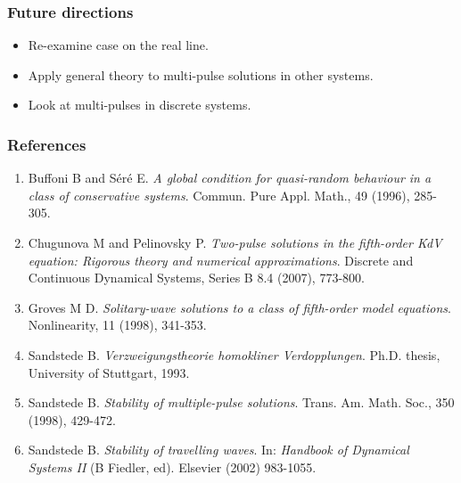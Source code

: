 \documentclass[16pt]{beamer}
\begin{document}
\begin{frame}
	\frametitle{Future directions}
	\fontsize{16}{7.2}\selectfont
	\begin{itemize}
		\item Re-examine case on the real line.
		\vspace{0.5cm}
		\item Apply general theory to multi-pulse solutions in other systems.
		\vspace{0.5cm}
		\item Look at multi-pulses in discrete systems.
	\end{itemize}
\end{frame}

\begin{frame}
	\frametitle{References}
	\fontsize{12}{7.2}\selectfont
	\begin{enumerate}
		\item Buffoni B and S\'er\'e E. \emph{A global condition for quasi-random behaviour in a class of conservative systems}. Commun. Pure Appl. Math., 49 (1996), 285-305.
		\item Chugunova M and Pelinovsky P. \emph{Two-pulse solutions in the fifth-order KdV equation: Rigorous theory and numerical approximations}. Discrete and Continuous Dynamical Systems, Series B 8.4 (2007), 773-800.
		\item Groves M D. \emph{Solitary-wave solutions to a class of fifth-order model equations}. Nonlinearity, 11 (1998), 341-353.
		\item Sandstede B. \emph{Verzweigungstheorie homokliner Verdopplungen}. Ph.D. thesis, University of Stuttgart, 1993.
		\item Sandstede B. \emph{Stability of multiple-pulse solutions}. Trans. Am. Math. Soc., 350 (1998), 429-472.
		\item Sandstede B. \emph{Stability of travelling waves}. In: \emph{Handbook of Dynamical Systems II} (B Fiedler, ed). Elsevier (2002) 983-1055.
	\end{enumerate}
\end{frame}
 
\end{document}
